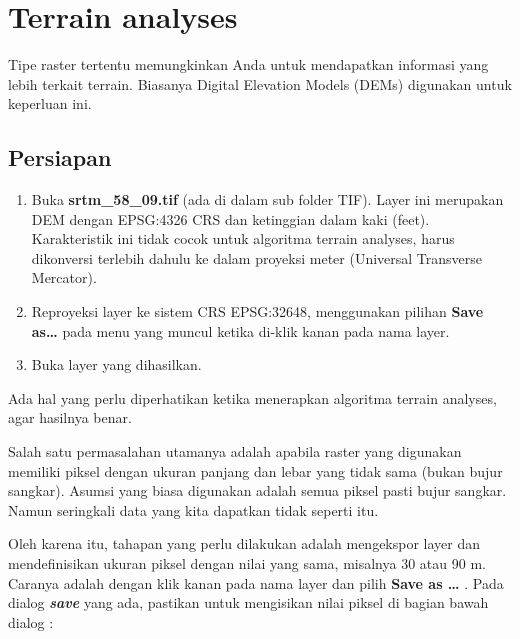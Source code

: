 \documentclass[]{book}
\begin{document}
\hypertarget{terrain-analyses}{%
\section{Terrain analyses}\label{terrain-analyses}}

Tipe raster tertentu memungkinkan Anda untuk mendapatkan informasi yang lebih terkait terrain. Biasanya Digital Elevation Models (DEMs) digunakan untuk keperluan ini.

\hypertarget{persiapan}{%
\subsection{Persiapan}\label{persiapan}}

\begin{enumerate}
\def\labelenumi{\arabic{enumi}.}
\item
  Buka \textbf{srtm\_58\_09.tif} (ada di dalam sub folder TIF). Layer ini merupakan DEM dengan
  EPSG:4326 CRS dan ketinggian dalam kaki (feet). Karakteristik ini tidak cocok untuk algoritma terrain analyses, harus dikonversi terlebih dahulu ke dalam proyeksi meter (Universal Transverse Mercator).
\item
  Reproyeksi layer ke sistem CRS EPSG:32648, menggunakan pilihan \textbf{Save as\ldots{}} pada menu yang muncul ketika di-klik kanan pada nama layer.
\item
  Buka layer yang dihasilkan.
\end{enumerate}

Ada hal yang perlu diperhatikan ketika menerapkan algoritma terrain analyses, agar hasilnya benar.

Salah satu permasalahan utamanya adalah apabila raster yang digunakan memiliki piksel dengan ukuran panjang dan lebar yang tidak sama (bukan bujur sangkar). Asumsi yang biasa digunakan adalah semua piksel pasti bujur sangkar. Namun seringkali data yang kita dapatkan tidak seperti itu.

Oleh karena itu, tahapan yang perlu dilakukan adalah mengekspor layer dan mendefinisikan ukuran piksel dengan nilai yang sama, misalnya 30 atau 90 m. Caranya adalah dengan klik kanan pada nama layer dan pilih \textbf{Save as \ldots{} }. Pada dialog \textbf{\emph{save}} yang ada, pastikan untuk mengisikan nilai piksel di bagian bawah dialog :
\end{document}
